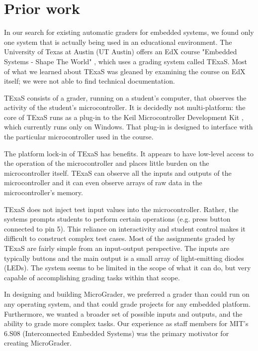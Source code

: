 \documentclass[12pt]{article}
\begin{document}
\clearpage
\section{Prior work}
In our search for existing automatic graders for embedded systems, we found only one system that is actually being used in an educational environment.  The University of Texas at Austin (UT Austin) offers an EdX course "Embedded Systems - Shape The World" \cite{ut-austin-edx}, which uses a grading system called TExaS.  Most of what we learned about TExaS was gleaned by examining the course on EdX itself; we were not able to find technical documentation.

TExaS consists of a grader, running on a student's computer, that observes the activity of the student's microcontroller.  It is decidedly not multi-platform: the core of TExaS runs as a plug-in to the Keil Microcontroller Development Kit \cite{keil}, which currently runs only on Windows.  That plug-in is designed to interface with the particular microcontroller used in the course.

The platform lock-in of TExaS has benefits.  It appears to have low-level access to the operation of the microcontroller and places little burden on the microcontroller itself.  TExaS can observe all the inputs and outputs of the microcontroller and it can even observe arrays of raw data in the microcontroller's memory.

TExaS does not inject test input values into the microcontroller.  Rather, the systems prompts students to perform certain operations (e.g. press button connected to pin 5).  This reliance on interactivity and student control makes it difficult to construct complex test cases.  Most of the assignments graded by TExaS are fairly simple from an input-output perspective.  The inputs are typically buttons and the main output is a small array of light-emitting diodes (LEDs).  The system seems to be limited in the scope of what it can do, but very capable of accomplishing grading tasks within that scope.

In designing and building MicroGrader, we preferred a grader than could run on any operating system, and that could grade projects for any embedded platform.  Furthermore, we wanted a broader set of possible inputs and outputs, and the ability to grade more complex tasks.  Our experience as staff members for MIT's 6.S08 (Interconnected Embedded Systems) was the primary motivator for creating MicroGrader.
\end{document}
